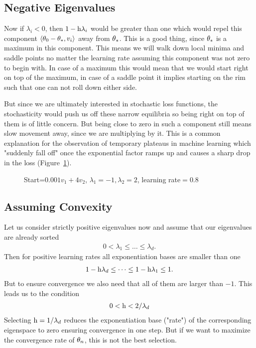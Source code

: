 \subsection{Negative Eigenvalues}\label{subsec: Negative Eigenvalues}

Now if \(\lambda_i<0\), then \(1-\text{h}\lambda_i\) would be greater
than one which would repel this component \(\langle \theta_0 - \theta_*,
v_i\rangle\) away from \(\theta_*\). This is a good thing, since \(\theta_*\)
is a maximum in this component. This means we will walk down local minima and
saddle points no matter the learning rate assuming  this component  was not
zero to begin with. In case of a maximum this would mean that we would start
right on top of the maximum, in case of a saddle point it implies starting on
the rim such that one can not roll down either side.

But since we are ultimately interested in stochastic loss functions, the
stochasticity would push us off these narrow equilibria so being right on
top of them is of little concern. But being close to zero in such a component
still means slow movement away, since we are multiplying by it. This is a
common explanation for the observation of temporary plateaus in machine learning
which "suddenly fall off" once the exponential factor ramps up and causes a
sharp drop in the loss (Figure~\ref{fig: visualize saddlepoint gd}).
%
\begin{figure}[h]
	\centering
	\def\svgwidth{1\textwidth}
	
	\caption{Start=\(0.001v_1+4v_2\), \(\lambda_1=-1, \lambda_2=2\), learning rate\(=0.8\)}
	\label{fig: visualize saddlepoint gd}
\end{figure}

\subsection{Assuming Convexity}

Let us consider strictly positive eigenvalues now and assume that our
eigenvalues are already sorted
%
\begin{align}
	0 < \lambda_1 \le \dots \le \lambda_d.
\end{align}
%
Then for positive learning rates all exponentiation bases are smaller than one
%
\begin{align*}
	1-\text{h}\lambda_d \le \dots \le 1-\text{h}\lambda_1 \le 1.
\end{align*}
%
But to ensure convergence we also need that all of them are larger than \(-1\).
This leads us to the condition
\begin{align}\label{eq: learning rate restriction (eigenvalue)}
	0< \text{h} < 2/\lambda_d
\end{align}
%
Selecting \(\text{h} = 1/\lambda_d\) reduces the exponentiation base ("rate") of the
corresponding eigenspace to zero ensuring convergence in one step.
But if we want to maximize the convergence rate of \(\theta_n\), this is not
the best selection.


